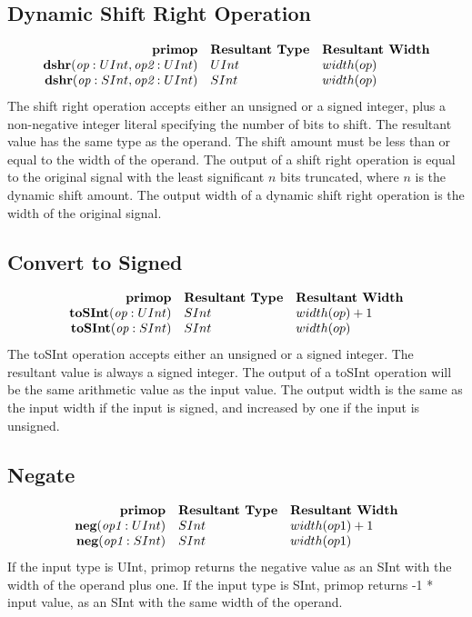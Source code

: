 \documentclass[12pt]{article}
\begin{document}
\subsection{Dynamic Shift Right Operation}
\[
\begin{array}{rll}
\text{\bf primop} & \text{\bf Resultant Type} & \text{\bf Resultant Width} \\
\text{\bf dshr}(\text{\em op}:UInt, \text{\em op2}:UInt)  & UInt & width(op) \\
\text{\bf dshr}(\text{\em op}:SInt, \text{\em op2}:UInt)  & SInt & width(op) \\
\end{array}
\]
The shift right operation accepts either an unsigned or a signed integer, plus a non-negative integer literal specifying the number of bits to shift.
The resultant value has the same type as the operand.
The shift amount must be less than or equal to the width of the operand.
The output of a shift right operation is equal to the original signal with the least significant $n$ bits truncated, where $n$ is the dynamic shift amount.
The output width of a dynamic shift right operation is the width of the original signal.

\subsection{Convert to Signed}
\[
\begin{array}{rll}
\text{\bf primop} & \text{\bf Resultant Type} & \text{\bf Resultant Width} \\
\text{\bf toSInt}(\text{\em op}:UInt)      & SInt & width(op) + 1 \\
\text{\bf toSInt}(\text{\em op}:SInt)      & SInt & width(op) \\
\end{array}
\]
The toSInt operation accepts either an unsigned or a signed integer.
The resultant value is always a signed integer.
The output of a toSInt operation will be the same arithmetic value as the input value.
The output width is the same as the input width if the input is signed, and increased by one if the input is unsigned.

\subsection{Negate}
\[
\begin{array}{rll}
\text{\bf primop} & \text{\bf Resultant Type} & \text{\bf Resultant Width} \\
\text{\bf neg}(\text{\em op1}:UInt)       & SInt & width(op1) + 1 \\
\text{\bf neg}(\text{\em op1}:SInt)       & SInt & width(op1) \\
\end{array}
\]
If the input type is UInt, primop returns the negative value as an SInt with the width of the operand plus one.
If the input type is SInt, primop returns -1 * input value, as an SInt with the same width of the operand.
\end{document}

